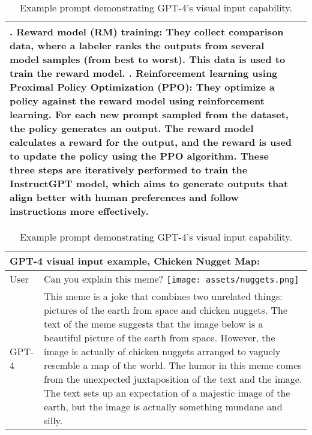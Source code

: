\documentclass{article}
\begin{document}
\begin{table}
\begin{tabular}[]{p{0.5in}p{5in}}
\newline
2. Reward model (RM) training: They collect comparison data, where a labeler ranks the outputs from several model samples (from best to worst). This data is used to train the reward model.\newline
\newline
3. Reinforcement learning using Proximal Policy Optimization (PPO): They optimize a policy against the reward model using reinforcement learning. For each new prompt sampled from the dataset, the policy generates an output. The reward model calculates a reward for the output, and the reward is used to update the policy using the PPO algorithm.\newline
\newline
These three steps are iteratively performed to train the InstructGPT model, which aims to generate outputs that align better with human preferences and follow instructions more effectively.\\
\bottomrule
\end{tabular}
\caption{Example prompt demonstrating GPT-4's visual input capability.}
\label{table:visual_input_pixel}
\end{table}

\begin{table}
\begin{tabular}[]{p{0.5in}p{4.5in}}
\toprule
\multicolumn{2}{p{5in}}{
\textbf{GPT-4 visual input example, Chicken Nugget Map}:}\\
\midrule
User & Can you explain this meme?\newline\newline
\texttt{[image: assets/nuggets.png]}\newline
\\
GPT-4 & This meme is a joke that combines two unrelated things: pictures of the earth from space and chicken nuggets.\newline
The text of the meme suggests that the image below is a beautiful picture of the earth from space. However, the image is actually of chicken nuggets arranged to vaguely resemble a map of the world.\newline
The humor in this meme comes from the unexpected juxtaposition of the text and the image. The text sets up an expectation of a majestic image of the earth, but the image is actually something mundane and silly.\\
\bottomrule
\end{tabular}
\caption{Example prompt demonstrating GPT-4's visual input capability.}
\label{table:visual_input_chicken}
\end{table}
\end{document}
